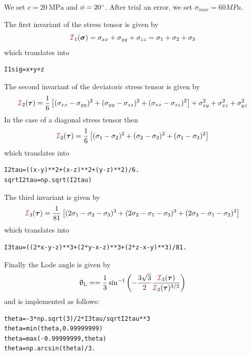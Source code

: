 We set $c=20~\si{\mega\pascal}$ and $\phi=20\degree$. After trial an error, we set $\sigma_{max}=60MPa$.

The first invariant of the stress tensor is given by 
\[
\III_1({\bm\sigma})=\sigma_{xx}+\sigma_{yy}+\sigma_{zz} = \sigma_1+\sigma_2+\sigma_3
\]
which translates into
\begin{lstlisting}
I1sig=x+y+z
\end{lstlisting}
The second invariant of the deviatoric stress tensor is given by 
\[
\III_2({\bm \tau})  
=\frac{1}{6}\left[(\sigma_{xx}-\sigma_{yy})^2 + (\sigma_{yy}-\sigma_{zz})^2 + (\sigma_{xx}-\sigma_{zz})^2 \right]  
+ \sigma_{xy}^2 + \sigma_{xz}^2 + \sigma_{yz}^2 
\]
In the case of a diagonal stress tensor then
\[
\III_2({\bm \tau})  
=\frac{1}{6}\left[(\sigma_{1}-\sigma_{2})^2 + (\sigma_{2}-\sigma_{3})^2 + (\sigma_{1}-\sigma_{3})^2 \right]  
\]
which translates into
\begin{lstlisting}
I2tau=((x-y)**2+(x-z)**2+(y-z)**2)/6.
sqrtI2tau=np.sqrt(I2tau)
\end{lstlisting}

The third invariant is given by
\[
\III_3(\bm \tau)
= \frac{1}{81}
\left[
(2\sigma_1-\sigma_2-\sigma_3)^3+
(2\sigma_2-\sigma_1-\sigma_3)^3+
(2\sigma_3-\sigma_1-\sigma_2)^3
\right] 
\]
which translates into
\begin{lstlisting}
I3tau=((2*x-y-z)**3+(2*y-x-z)**3+(2*z-x-y)**3)/81.
\end{lstlisting}

Finally the Lode angle is given by
\[
\uptheta_{\rm L} = 
=\frac{1}{3} \sin^{-1} 
\left( -\frac{3\sqrt{3}}{2} \frac{{\III}_3({\bm \tau})}{{\III}_2({\bm \tau})^{3/2}} \right)
\]
and is implemented as follows:
\begin{lstlisting}
theta=-3*np.sqrt(3)/2*I3tau/sqrtI2tau**3
theta=min(theta,0.99999999)
theta=max(-0.99999999,theta)
theta=np.arcsin(theta)/3.
\end{lstlisting}

